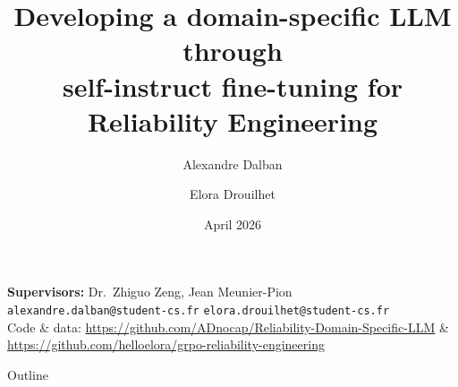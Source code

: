 \documentclass[aspectratio=169,10pt]{beamer}
\title[Domain-specific LLM for Reliability Engineering]{Developing a domain-specific LLM through\\self-instruct fine-tuning for Reliability Engineering}
\author[Dalban \& Drouilhet]{Alexandre Dalban \and Elora Drouilhet}
\institute[CentraleSup\'elec]{%
  Laboratoire G\'enie Industriel (LGI)\\
  CentraleSup\'elec -- Universit\'e Paris-Saclay}
\date{April 2026}
\begin{document}
\begin{frame}
\titlepage
\vspace{-1em}
\begin{center}
  \small\textbf{Supervisors:} Dr.\ Zhiguo Zeng, Jean Meunier-Pion\\[4pt]
  \footnotesize\texttt{alexandre.dalban@student-cs.fr} \quad\texttt{elora.drouilhet@student-cs.fr}\\[2pt]
  \footnotesize Code \& data: \url{https://github.com/ADnocap/Reliability-Domain-Specific-LLM} & \url{https://github.com/helloelora/grpo-reliability-engineering}
\end{center}
\end{frame}

\begin{frame}{Outline}
\tableofcontents
\end{frame}

\end{document}
